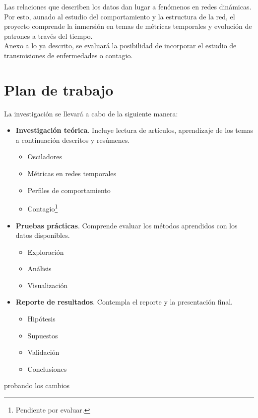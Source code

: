 \documentclass[10pt]{article}
\begin{document}
Las relaciones que describen los datos dan lugar a fenómenos en redes
dinámicas. Por esto, aunado al estudio del comportamiento y la estructura
de la red, el proyecto comprende la inmersión en temas de métricas temporales y
evolución de patrones a través del tiempo.\\

Anexo a lo ya descrito, se evaluará la posibilidad de incorporar el estudio de
transmisiones de enfermedades o contagio.



\section{Plan de trabajo}
\label{sec:plan}

La investigación se llevará a cabo de la siguiente manera:

\begin{itemize}
 \item {\bf Investigación teórica}. Incluye lectura de artículos, aprendizaje
  de los temas a continuación descritos y resúmenes.
  \begin{itemize}
   \item Osciladores
   \item Métricas en redes temporales
   \item Perfiles de comportamiento 
   \item Contagio\footnote{Pendiente por evaluar.}
  \end{itemize}
 \item {\bf Pruebas prácticas}. Comprende evaluar los métodos aprendidos con
 los datos disponibles.
  \begin{itemize}
   \item Exploración
   \item Análisis
   \item Visualización
  \end{itemize}
 \item {\bf Reporte de resultados}. Contempla el reporte y la presentación final.
  \begin{itemize}
   \item Hipótesis
   \item Supuestos
   \item Validación
   \item Conclusiones
  \end{itemize}
\end{itemize}


 probando los cambios



% 
% 
\end{document}
